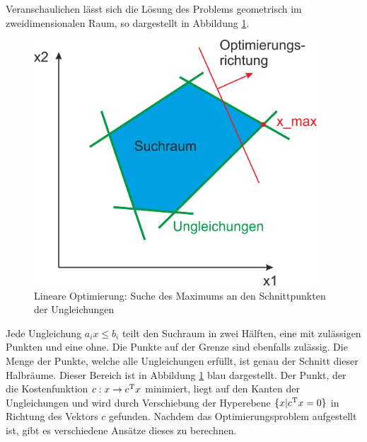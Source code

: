 \documentclass{like}
\begin{document}
Veranschaulichen lässt sich die Lösung des Problems geometrisch im zweidimensionalen Raum, so dargestellt in Abbildung \ref{fig:linOpt}.

\begin{figure}[ht!]
	\centering
	\includegraphics[width=300pt]{Abbildungen/linearOpt.png}
	\caption{Lineare Optimierung: Suche des Maximums an den Schnittpunkten der Ungleichungen}
	\label{fig:linOpt}
\end{figure}

Jede Ungleichung $a_i x \leq b_i$ teilt den Suchraum in zwei Hälften, eine mit zulässigen Punkten und eine ohne. Die Punkte auf der Grenze sind ebenfalls zulässig. Die Menge der Punkte, welche alle Ungleichungen erfüllt, ist genau der Schnitt dieser Halbräume. Dieser Bereich ist in Abbildung \ref{fig:linOpt} blau dargestellt. Der Punkt, der die Kostenfunktion $c: x \rightarrow c\textsuperscript{T} x$ minimiert, liegt auf den Kanten der Ungleichungen und wird durch Verschiebung der Hyperebene $ \{x| c\textsuperscript{T} x = 0 \}$ in Richtung des Vektors \(c\) gefunden. Nachdem das Optimierungsproblem aufgestellt ist, gibt es verschiedene Ansätze dieses zu berechnen.
\end{document}
